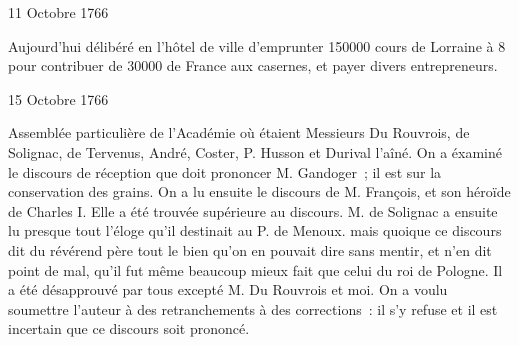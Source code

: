                      
                     \begin{diary}{11 Octobre 1766}{}
                        
                         Aujourd'hui délibéré en l’hôtel de ville
                           d’emprunter 150000 cours de Lorraine à
                           8 %
                           pour contribuer de 30000 de France aux
                           casernes, et payer
                           divers entrepreneurs. \bigskip
        
        
                     \end{diary}

                     \begin{diary}{15 Octobre 1766}{}
                        
                         Assemblée particulière de l’Académie
                           où étaient Messieurs
                           Du Rouvrois, de Solignac,
                           de Tervenus, André, Coster, P. Husson et
                           Durival l’aîné. On a éxaminé
                           le
                           discours de réception que doit
                           prononcer
                           M. Gandoger ; il est sur la
                           conservation
                           des grains. On a lu ensuite le discours
                              de M.
                                 François, et son héroïde de Charles I.
                           Elle a été trouvée supérieure au discours.
                           M. de Solignac a ensuite lu
                           presque
                           tout l’éloge qu’il destinait au P. de
                              Menoux.
                           mais quoique ce discours dit du révérend père tout
                           le bien qu’on en pouvait dire sans mentir,
                           et n’en dit point de mal, qu’il fut même
                           beaucoup mieux fait que celui du roi de Pologne.
                           Il a été désapprouvé par tous excepté
                           M. Du Rouvrois et moi. On a
                           voulu
                           soumettre l’auteur à des retranchements
                           à des corrections : il s’y refuse et il
                           est incertain que ce discours soit prononcé. \bigskip
        
        
                     \end{diary}

